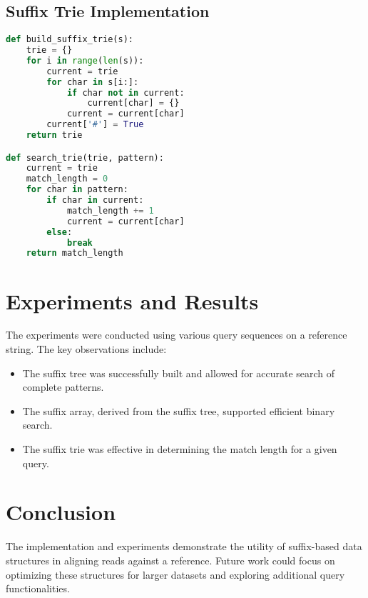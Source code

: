 \documentclass{article}
\begin{document}
\subsection{Suffix Trie Implementation}
\begin{lstlisting}[language=Python, caption=build_suffix_trie and search_trie]
def build_suffix_trie(s):
    trie = {}
    for i in range(len(s)):
        current = trie
        for char in s[i:]:
            if char not in current:
                current[char] = {}
            current = current[char]
        current['#'] = True
    return trie

def search_trie(trie, pattern):
    current = trie
    match_length = 0
    for char in pattern:
        if char in current:
            match_length += 1
            current = current[char]
        else:
            break
    return match_length
\end{lstlisting}

\section{Experiments and Results}
The experiments were conducted using various query sequences on a reference string. The key observations include:
\begin{itemize}
    \item The suffix tree was successfully built and allowed for accurate search of complete patterns.
    \item The suffix array, derived from the suffix tree, supported efficient binary search.
    \item The suffix trie was effective in determining the match length for a given query.
\end{itemize}

\section{Conclusion}
The implementation and experiments demonstrate the utility of suffix-based data structures in aligning reads against a reference. Future work could focus on optimizing these structures for larger datasets and exploring additional query functionalities.
\end{document}
